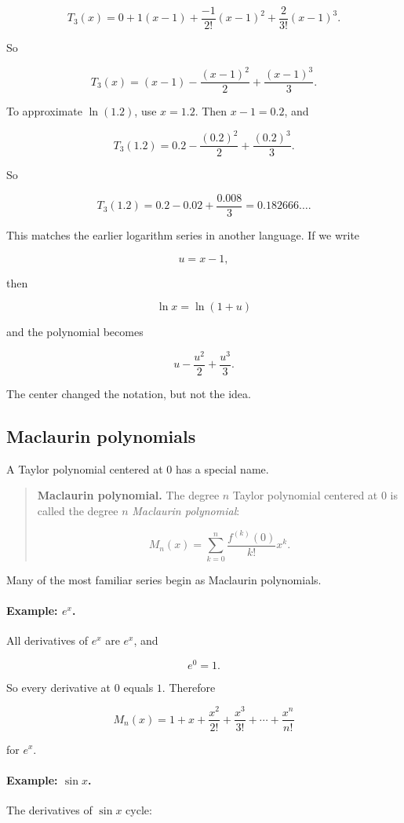\[
T_3(x)
=
0+1(x-1)+\frac{-1}{2!}(x-1)^2+\frac{2}{3!}(x-1)^3.
\]

So

\[
\boxed{
T_3(x)
=
(x-1)-\frac{(x-1)^2}{2}+\frac{(x-1)^3}{3}.
}
\]

To approximate \(\ln(1.2)\), use \(x=1.2\).  Then \(x-1=0.2\), and

\[
T_3(1.2)
=
0.2-\frac{(0.2)^2}{2}+\frac{(0.2)^3}{3}.
\]

So

\[
T_3(1.2)
=
0.2-0.02+\frac{0.008}{3}
=
0.182666\ldots.
\]

This matches the earlier logarithm series in another language.  If we write

\[
u=x-1,
\]

then

\[
\ln x=\ln(1+u)
\]

and the polynomial becomes

\[
u-\frac{u^2}{2}+\frac{u^3}{3}.
\]

The center changed the notation, but not the idea.

\subsection{Maclaurin polynomials}
\label{subsec:maclaurin-polynomials}

A Taylor polynomial centered at \(0\) has a special name.

\begin{quote}
\textbf{Maclaurin polynomial.}
The degree \(n\) Taylor polynomial centered at \(0\) is called the degree \(n\)
\emph{Maclaurin polynomial}:

\[
\boxed{
M_n(x)=
\sum_{k=0}^{n}
\frac{f^{(k)}(0)}{k!}x^k.
}
\]
\end{quote}

Many of the most familiar series begin as Maclaurin polynomials.

\paragraph{Example: \(e^x\).}
All derivatives of \(e^x\) are \(e^x\), and

\[
e^0=1.
\]

So every derivative at \(0\) equals \(1\).  Therefore

\[
\boxed{
M_n(x)=
1+x+\frac{x^2}{2!}+\frac{x^3}{3!}+\cdots+\frac{x^n}{n!}
}
\]

for \(e^x\).

\paragraph{Example: \(\sin x\).}
The derivatives of \(\sin x\) cycle:

